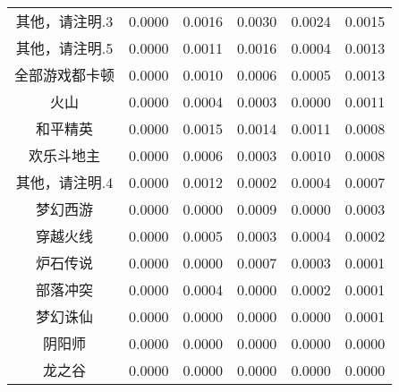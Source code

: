 \documentclass{MathorCupmodeling}
\begin{document}
\begin{table}[htbp]
{\begin{tabular}{c|cccc|c}
		  其他，请注明.3 & 0.0000  & 0.0016  & 0.0030  & 0.0024  & 0.0015  \\
		  其他，请注明.5 & 0.0000  & 0.0011  & 0.0016  & 0.0004  & 0.0013  \\
		  全部游戏都卡顿 & 0.0000  & 0.0010  & 0.0006  & 0.0005  & 0.0013  \\
		  火山    & 0.0000  & 0.0004  & 0.0003  & 0.0000  & 0.0011  \\
		  和平精英  & 0.0000  & 0.0015  & 0.0014  & 0.0011  & 0.0008  \\
		  欢乐斗地主 & 0.0000  & 0.0006  & 0.0003  & 0.0010  & 0.0008  \\
		  其他，请注明.4 & 0.0000  & 0.0012  & 0.0002  & 0.0004  & 0.0007  \\
		  梦幻西游  & 0.0000  & 0.0000  & 0.0009  & 0.0000  & 0.0003  \\
		  穿越火线  & 0.0000  & 0.0005  & 0.0003  & 0.0004  & 0.0002  \\
		  炉石传说  & 0.0000  & 0.0000  & 0.0007  & 0.0003  & 0.0001  \\
		  部落冲突  & 0.0000  & 0.0004  & 0.0000  & 0.0002  & 0.0001  \\
		  梦幻诛仙  & 0.0000  & 0.0000  & 0.0000  & 0.0000  & 0.0001  \\
		  阴阳师   & 0.0000  & 0.0000  & 0.0000  & 0.0000  & 0.0000  \\
		  龙之谷   & 0.0000  & 0.0000  & 0.0000  & 0.0000  & 0.0000  \\
		  \bottomrule
		  \end{tabular}}
		\label{tab:上网业务影响因素量化2}
	\end{table}
	
\end{document}
